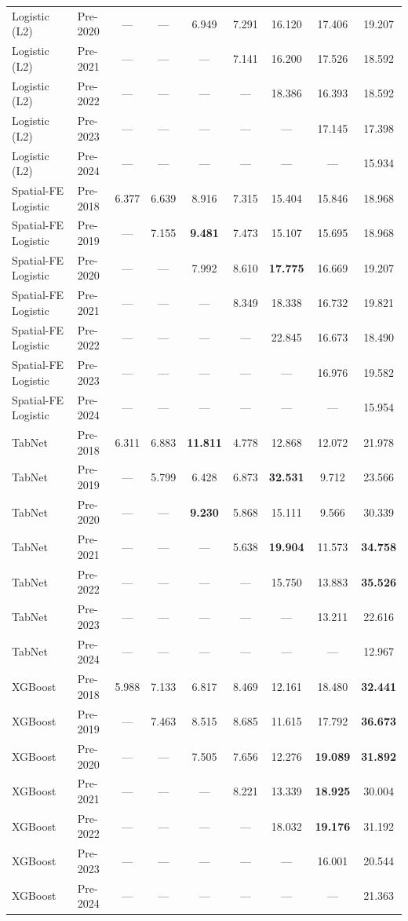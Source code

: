\begin{table}[htbp]
{\begin{tabular}{l lccccccc}
Logistic (L2) & Pre-2020 & --- & --- & 6.949 & 7.291 & 16.120 & 17.406 & 19.207 \\
Logistic (L2) & Pre-2021 & --- & --- & --- & 7.141 & 16.200 & 17.526 & 18.592 \\
Logistic (L2) & Pre-2022 & --- & --- & --- & --- & 18.386 & 16.393 & 18.592 \\
Logistic (L2) & Pre-2023 & --- & --- & --- & --- & --- & 17.145 & 17.398 \\
Logistic (L2) & Pre-2024 & --- & --- & --- & --- & --- & --- & 15.934 \\
Spatial-FE Logistic & Pre-2018 & 6.377 & 6.639 & 8.916 & 7.315 & 15.404 & 15.846 & 18.968 \\
Spatial-FE Logistic & Pre-2019 & --- & 7.155 & \textbf{9.481} & 7.473 & 15.107 & 15.695 & 18.968 \\
Spatial-FE Logistic & Pre-2020 & --- & --- & 7.992 & 8.610 & \textbf{17.775} & 16.669 & 19.207 \\
Spatial-FE Logistic & Pre-2021 & --- & --- & --- & 8.349 & 18.338 & 16.732 & 19.821 \\
Spatial-FE Logistic & Pre-2022 & --- & --- & --- & --- & 22.845 & 16.673 & 18.490 \\
Spatial-FE Logistic & Pre-2023 & --- & --- & --- & --- & --- & 16.976 & 19.582 \\
Spatial-FE Logistic & Pre-2024 & --- & --- & --- & --- & --- & --- & 15.954 \\
TabNet & Pre-2018 & 6.311 & 6.883 & \textbf{11.811} & 4.778 & 12.868 & 12.072 & 21.978 \\
TabNet & Pre-2019 & --- & 5.799 & 6.428 & 6.873 & \textbf{32.531} & 9.712 & 23.566 \\
TabNet & Pre-2020 & --- & --- & \textbf{9.230} & 5.868 & 15.111 & 9.566 & 30.339 \\
TabNet & Pre-2021 & --- & --- & --- & 5.638 & \textbf{19.904} & 11.573 & \textbf{34.758} \\
TabNet & Pre-2022 & --- & --- & --- & --- & 15.750 & 13.883 & \textbf{35.526} \\
TabNet & Pre-2023 & --- & --- & --- & --- & --- & 13.211 & 22.616 \\
TabNet & Pre-2024 & --- & --- & --- & --- & --- & --- & 12.967 \\
XGBoost & Pre-2018 & 5.988 & 7.133 & 6.817 & 8.469 & 12.161 & 18.480 & \textbf{32.441} \\
XGBoost & Pre-2019 & --- & 7.463 & 8.515 & 8.685 & 11.615 & 17.792 & \textbf{36.673} \\
XGBoost & Pre-2020 & --- & --- & 7.505 & 7.656 & 12.276 & \textbf{19.089} & \textbf{31.892} \\
XGBoost & Pre-2021 & --- & --- & --- & 8.221 & 13.339 & \textbf{18.925} & 30.004 \\
XGBoost & Pre-2022 & --- & --- & --- & --- & 18.032 & \textbf{19.176} & 31.192 \\
XGBoost & Pre-2023 & --- & --- & --- & --- & --- & 16.001 & 20.544 \\
XGBoost & Pre-2024 & --- & --- & --- & --- & --- & --- & 21.363 \\
\bottomrule
\end{tabular}%
}
\end{table}